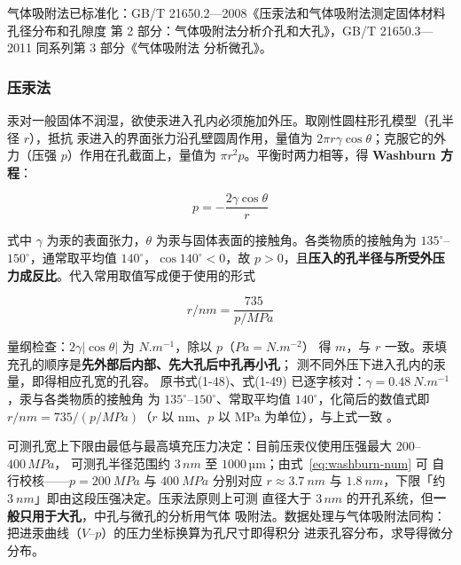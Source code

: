 气体吸附法已标准化：GB/T 21650.2—2008《压汞法和气体吸附法测定固体材料孔径分布和孔隙度
第 2 部分：气体吸附法分析介孔和大孔》，GB/T 21650.3—2011 同系列第 3 部分《气体吸附法
分析微孔》。

\subsubsection{压汞法}

\begin{principle}
汞对一般固体不润湿，欲使汞进入孔内必须施加外压。取刚性圆柱形孔模型（孔半径 $r$），抵抗
汞进入的界面张力沿孔壁圆周作用，量值为 $2\pi r\gamma\cos\theta$；克服它的外力（压强
$p$）作用在孔截面上，量值为 $\pi r^{2}p$。平衡时两力相等，得 \textbf{Washburn 方程}：

\begin{equation}\label{eq:washburn}
p=-\frac{2\gamma\cos\theta}{r}
\end{equation}

式中 $\gamma$ 为汞的表面张力，$\theta$ 为汞与固体表面的接触角。各类物质的接触角为
$135^{\circ}$--$150^{\circ}$，通常取平均值 $140^{\circ}$，$\cos140^{\circ}<0$，故
$p>0$，且\textbf{压入的孔半径与所受外压力成反比}。代入常用取值写成便于使用的形式

\begin{equation}\label{eq:washburn-num}
r/\unit{nm}=\frac{735}{p/\unit{MPa}}
\end{equation}

量纲检查：$2\gamma|\cos\theta|$ 为 $\unit{N.m^{-1}}$，除以 $p$（$\unit{Pa}=\unit{N.m^{-2}}$）
得 $\unit{m}$，与 $r$ 一致。汞填充孔的顺序是\textbf{先外部后内部、先大孔后中孔再小孔}；
测不同外压下进入孔内的汞量，即得相应孔宽的孔容。
原书式(1-48)、式(1-49) 已逐字核对：$\gamma=\qty{0.48}{N.m^{-1}}$，汞与各类物质的接触角
为 $135^{\circ}$--$150^{\circ}$、常取平均值 $140^{\circ}$，化简后的数值式即
$r/\unit{nm}=735/(p/\unit{MPa})$（$r$ 以 nm、$p$ 以 MPa 为单位），与上式一致
。
\end{principle}

可测孔宽上下限由最低与最高填充压力决定：目前压汞仪使用压强最大 $200$--$400\,\unit{MPa}$，
可测孔半径范围约 $3\,\unit{nm}$ 至 $1000$\,µm；由式~\eqref{eq:washburn-num} 可
自行校核——$p=\qty{200}{MPa}$ 与 $\qty{400}{MPa}$ 分别对应 $r\approx\qty{3.7}{nm}$ 与
$\qty{1.8}{nm}$，下限「约 $\qty{3}{nm}$」即由这段压强决定。压汞法原则上可测
直径大于 $3\,\unit{nm}$ 的开孔系统，但\textbf{一般只用于大孔}，中孔与微孔的分析用气体
吸附法。数据处理与气体吸附法同构：把进汞曲线（$V$--$p$）的压力坐标换算为孔尺寸即得积分
进汞孔容分布，求导得微分分布。

